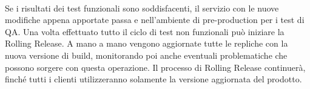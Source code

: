 \paragraph{}
Se i risultati dei test funzionali sono soddisfacenti, il servizio con le nuove modifiche appena apportate passa e nell'ambiente di pre-production per i test di QA. Una volta effettuato tutto il ciclo di test non funzionali può iniziare la Rolling Release. A mano a mano vengono aggiornate tutte le repliche con la nuova versione di build, monitorando poi anche eventuali problematiche che possono sorgere con questa operazione. Il processo di Rolling Release continuerà,  finché tutti i clienti utilizzeranno solamente la versione aggiornata del prodotto.


